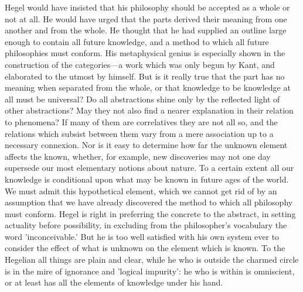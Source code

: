 \documentclass[11pt,letter]{article}
\begin{document}
\par  Hegel would have insisted that his philosophy should be accepted as a whole or not at all. He would have urged that the parts derived their meaning from one another and from the whole. He thought that he had supplied an outline large enough to contain all future knowledge, and a method to which all future philosophies must conform. His metaphysical genius is especially shown in the construction of the categories—a work which was only begun by Kant, and elaborated to the utmost by himself. But is it really true that the part has no meaning when separated from the whole, or that knowledge to be knowledge at all must be universal? Do all abstractions shine only by the reflected light of other abstractions? May they not also find a nearer explanation in their relation to phenomena? If many of them are correlatives they are not all so, and the relations which subsist between them vary from a mere association up to a necessary connexion. Nor is it easy to determine how far the unknown element affects the known, whether, for example, new discoveries may not one day supersede our most elementary notions about nature. To a certain extent all our knowledge is conditional upon what may be known in future ages of the world. We must admit this hypothetical element, which we cannot get rid of by an assumption that we have already discovered the method to which all philosophy must conform. Hegel is right in preferring the concrete to the abstract, in setting actuality before possibility, in excluding from the philosopher's vocabulary the word 'inconceivable.' But he is too well satisfied with his own system ever to consider the effect of what is unknown on the element which is known. To the Hegelian all things are plain and clear, while he who is outside the charmed circle is in the mire of ignorance and 'logical impurity': he who is within is omniscient, or at least has all the elements of knowledge under his hand.
\end{document}
